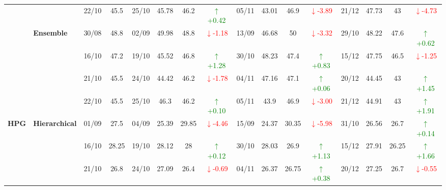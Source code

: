 {\begin{longtable}{llcc|cccc|cccc|cccc}
&
& 22/10 & 45.5 & 25/10 & 45.78 & 46.2 & \textcolor{green}{\(\uparrow\)+0.42} & 05/11 & 43.01 & 46.9 & \textcolor{red}{\(\downarrow\)-3.89} & 21/12 & 47.73 & 43 & \textcolor{red}{\(\downarrow\)-4.73} \\
\cmidrule(lr){2-16}



& \textbf{Ensemble}
& 30/08 & 48.8 & 02/09 & 49.98 & 48.8 & \textcolor{red}{\(\downarrow\)-1.18} & 13/09 & 46.68 & 50 & \textcolor{red}{\(\downarrow\)-3.32} & 29/10 & 48.22 & 47.6 & \textcolor{green}{\(\uparrow\)+0.62} \\

&
& 16/10 & 47.2 & 19/10 & 45.52 & 46.8 & \textcolor{green}{\(\uparrow\)+1.28} & 30/10 & 48.23 & 47.4 & \textcolor{green}{\(\uparrow\)+0.83} & 15/12 & 47.75 & 46.5 & \textcolor{red}{\(\downarrow\)-1.25} \\

&
& 21/10 & 45.5 & 24/10 & 44.42 & 46.2 & \textcolor{red}{\(\downarrow\)-1.78} & 04/11 & 47.16 & 47.1 & \textcolor{green}{\(\uparrow\)+0.06} & 20/12 & 44.45 & 43 & \textcolor{green}{\(\uparrow\)+1.45} \\

&
& 22/10 & 45.5 & 25/10 & 46.3 & 46.2 & \textcolor{green}{\(\uparrow\)+0.10} & 05/11 & 43.9 & 46.9 & \textcolor{red}{\(\downarrow\)-3.00} & 21/12 & 44.91 & 43 & \textcolor{green}{\(\uparrow\)+1.91} \\
\midrule


\multirow{12}{*}{\textbf{HPG}} 
& \textbf{Hierarchical}
& 01/09 & 27.5 & 04/09 & 25.39 & 29.85 & \textcolor{red}{\(\downarrow\)-4.46} & 15/09 & 24.37 & 30.35 & \textcolor{red}{\(\downarrow\)-5.98} & 31/10 & 26.56 & 26.7 & \textcolor{green}{\(\uparrow\)+0.14} \\

& 
& 16/10 & 28.25 & 19/10 & 28.12 & 28 & \textcolor{green}{\(\uparrow\)+0.12} & 30/10 & 28.03 & 26.9 & \textcolor{green}{\(\uparrow\)+1.13} & 15/12 & 27.91 & 26.25 & \textcolor{green}{\(\uparrow\)+1.66} \\

& 
& 21/10 & 26.8 & 24/10 & 27.09 & 26.4 & \textcolor{red}{\(\downarrow\)-0.69} & 04/11 & 26.37 & 26.75 & \textcolor{green}{\(\uparrow\)+0.38} & 20/12 & 27.25 & 26.7 & \textcolor{red}{\(\downarrow\)-0.55} \\


\end{longtable}}
